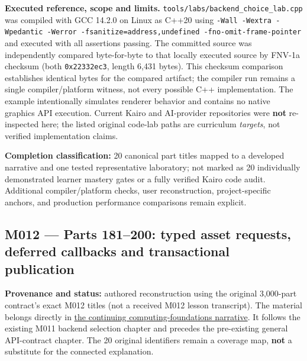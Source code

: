 \textbf{Executed reference, scope and limits.} \texttt{tools/labs/backend\_choice\_lab.cpp} was compiled with GCC 14.2.0 on Linux as C++20 using \texttt{-Wall\ -Wextra\ -Wpedantic\ -Werror\ -fsanitize=address,undefined\ -fno-omit-frame-pointer} and executed with all assertions passing. The committed source was independently compared byte-for-byte to that locally executed source by FNV-1a checksum (both \texttt{0x22332ec3}, length 6,431 bytes). This checksum comparison establishes identical bytes for the compared artifact; the compiler run remains a single compiler/platform witness, not every possible C++ implementation. The example intentionally simulates renderer behavior and contains no native graphics API execution. Current Kairo and AI-provider repositories were \textbf{not} re-inspected here; the listed original code-lab paths are curriculum \emph{targets}, not verified implementation claims.

\textbf{Completion classification:} 20 canonical part titles mapped to a developed narrative and one tested representative laboratory; not marked as 20 individually demonstrated learner mastery gates or a fully verified Kairo code audit. Additional compiler/platform checks, user reconstruction, project-specific anchors, and production performance comparisons remain explicit.

\subsection{M012 --- Parts 181--200: typed asset requests, deferred callbacks and transactional publication}\label{appendix-fd090d982a15-m012-parts-181200-typed-asset-requests-deferred-callbacks-and-transactional-publication}

\hypertarget{appendix-fd090d982a15-m012-parts-181200-typed-asset-requests-deferred-callbacks-and-transactional-publication}{}

\textbf{Provenance and status:} authored reconstruction using the original 3,000-part contract's exact M012 titles (not a received M012 lesson transcript). The material belongs directly in \hyperref[01-foundations-i-ch004-from-an-accepted-render-request-to-a-resource-that-survives-failures-and-callbacks]{the continuing computing-foundations narrative}. It follows the existing M011 backend selection chapter and precedes the pre-existing general API-contract chapter. The 20 original identifiers remain a coverage map, \textbf{not} a substitute for the connected explanation.


